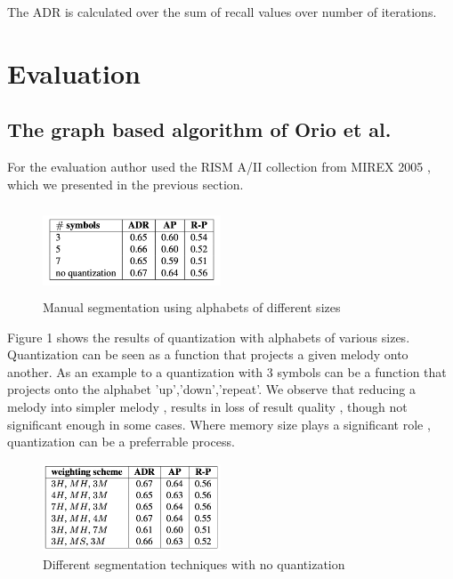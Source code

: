 \documentclass{llncs}
\begin{document}
			The ADR is calculated over the sum of recall values over number of iterations.     

	\section{Evaluation}
		\subsection{The graph based algorithm of Orio et al.}
			For the evaluation author used the RISM A/II collection from MIREX 2005  , which we  presented in the previous section.


			\begin{figure}[h!]
			\centering
			\includegraphics[width=200px,height=100px,keepaspectratio]{one_of_two_point_four}
			\caption{Manual segmentation using alphabets of different sizes \cite{two_point_four}}
			\end{figure}


			Figure 1 shows the results of quantization with alphabets of various sizes. Quantization can be seen as a function that projects a given melody onto another. As an example to a quantization with 3 symbols can be a function that projects onto the alphabet {'up','down','repeat'}. We observe that reducing a melody into simpler melody , results in loss of result quality , though not significant enough in some cases. Where memory size plays a significant role , quantization can be a preferrable process.   

			\begin{figure}[h!]
			\centering
			\includegraphics[width=200px,height=100px,keepaspectratio]{three_of_two_point_four}
			\caption{Different segmentation techniques with no quantization \cite{two_point_four}}
			\end{figure}
\end{document}
